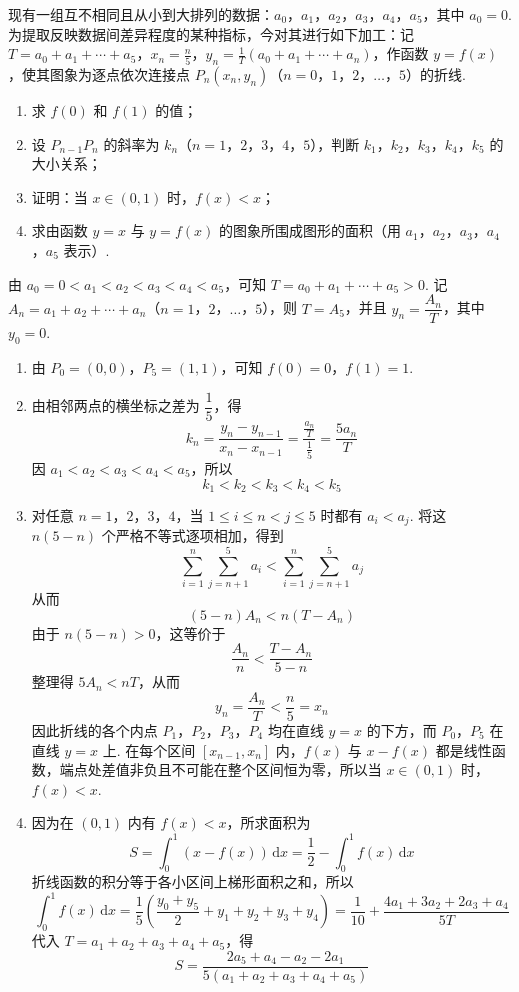 \begin{problem}
现有一组互不相同且从小到大排列的数据：\(a_0\)，\(a_1\)，\(a_2\)，\(a_3\)，\(a_4\)，\(a_5\)，其中 \(a_0=0\). 为提取反映数据间差异程度的某种指标，今对其进行如下加工：记 \(T=a_0+a_1+\cdots+a_5\)，\(x_n=\frac n5\)，\(y_n=\frac1T\left(a_0+a_1+\cdots+a_n\right)\)，作函数 \(y=f(x)\)，使其图象为逐点依次连接点 \(P_n\left(x_n,y_n\right)\)（\(n=0\)，\(1\)，\(2\)，\(\ldots\)，\(5\)）的折线.

\begin{enumerate}
\item 求 \(f(0)\) 和 \(f(1)\) 的值；
\item 设 \(P_{n-1}P_n\) 的斜率为 \(k_n\)（\(n=1\)，\(2\)，\(3\)，\(4\)，\(5\)），判断 \(k_1\)，\(k_2\)，\(k_3\)，\(k_4\)，\(k_5\) 的大小关系；
\item 证明：当 \(x\in\left(0,1\right)\) 时，\(f(x)<x\)；
\item 求由函数 \(y=x\) 与 \(y=f(x)\) 的图象所围成图形的面积（用 \(a_1\)，\(a_2\)，\(a_3\)，\(a_4\)，\(a_5\) 表示）.
\end{enumerate}
\end{problem}

\begin{solution}
由 \(a_0=0<a_1<a_2<a_3<a_4<a_5\)，可知 \(T=a_0+a_1+\cdots+a_5>0\). 记 \(A_n=a_1+a_2+\cdots+a_n\)（\(n=1\)，\(2\)，\(\ldots\)，\(5\)），则 \(T=A_5\)，并且 \(y_n=\dfrac{A_n}{T}\)，其中 \(y_0=0\).

\begin{enumerate}
\item 由 \(P_0=(0,0)\)，\(P_5=(1,1)\)，可知
\(f(0)=0\)，\(f(1)=1\).

\item 由相邻两点的横坐标之差为 \(\dfrac15\)，得
\[
k_n=\dfrac{y_n-y_{n-1}}{x_n-x_{n-1}}=\dfrac{\frac{a_n}{T}}{\frac{1}{5}}=\dfrac{5a_n}{T}
\]
因 \(a_1<a_2<a_3<a_4<a_5\)，所以
\[
k_1<k_2<k_3<k_4<k_5
\]

\item 对任意 \(n=1\)，\(2\)，\(3\)，\(4\)，当 \(1\leqslant i\leqslant n<j\leqslant5\) 时都有 \(a_i<a_j\). 将这 \(n(5-n)\) 个严格不等式逐项相加，得到
\[
\sum_{i=1}^n\sum_{j=n+1}^5 a_i<\sum_{i=1}^n\sum_{j=n+1}^5 a_j
\]
从而
\[
(5-n)A_n<n(T-A_n)
\]
由于 \(n(5-n)>0\)，这等价于
\[
\dfrac{A_n}{n}<\dfrac{T-A_n}{5-n}
\]
整理得 \(5A_n<nT\)，从而
\[
y_n=\dfrac{A_n}{T}<\dfrac n5=x_n
\]
因此折线的各个内点 \(P_1\)，\(P_2\)，\(P_3\)，\(P_4\) 均在直线 \(y=x\) 的下方，而 \(P_0\)，\(P_5\) 在直线 \(y=x\) 上. 在每个区间 \(\left[x_{n-1},x_n\right]\) 内，\(f(x)\) 与 \(x-f(x)\) 都是线性函数，端点处差值非负且不可能在整个区间恒为零，所以当 \(x\in\left(0,1\right)\) 时，\(f(x)<x\).

\item 因为在 \(\left(0,1\right)\) 内有 \(f(x)<x\)，所求面积为
\[
S=\int_0^1\left(x-f(x)\right)\,\mathrm{d}x=\dfrac12-\int_0^1f(x)\,\mathrm{d}x
\]
折线函数的积分等于各小区间上梯形面积之和，所以
\[
\int_0^1f(x)\,\mathrm{d}x=\dfrac15\left(\dfrac{y_0+y_5}{2}+y_1+y_2+y_3+y_4\right)=\dfrac1{10}+\dfrac{4a_1+3a_2+2a_3+a_4}{5T}
\]
代入 \(T=a_1+a_2+a_3+a_4+a_5\)，得
\[
S=\dfrac{2a_5+a_4-a_2-2a_1}{5\left(a_1+a_2+a_3+a_4+a_5\right)}
\]
\end{enumerate}
\end{solution}
